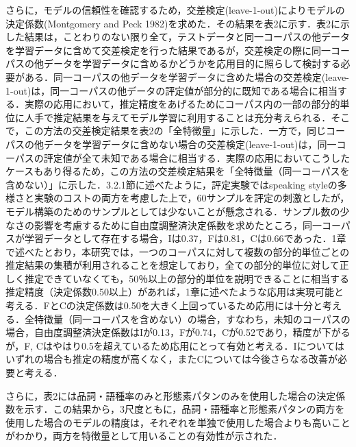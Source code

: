 \documentclass[japanese]{jnlp_1.4}
\begin{document}
さらに，モデルの信頼性を確認するため，交差検定(leave-1-out)によりモデルの決定係数(Montgomery and Peck 1982)を求めた．その結果を表2に示す．表2に示した結果は，ことわりのない限り全て，テストデータと同一コーパスの他データを学習データに含めて交差検定を行った結果であるが，交差検定の際に同一コーパスの他データを学習データに含めるかどうかを応用目的に照らして検討する必要がある．同一コーパスの他データを学習データに含めた場合の交差検定(leave-1-out)は，同一コーパスの他データの評定値が部分的に既知である場合に相当する．実際の応用において，推定精度をあげるためにコーパス内の一部の部分的単位に人手で推定結果を与えてモデル学習に利用することは充分考えられる．そこで，この方法の交差検定結果を表2の「全特徴量」に示した．一方で，同じコーパスの他データを学習データに含めない場合の交差検定(leave-1-out)は，同一コーパスの評定値が全て未知である場合に相当する．実際の応用においてこうしたケースもあり得るため，この方法の交差検定結果を「全特徴量（同一コーパスを含めない）」に示した．3.2.1節に述べたように，評定実験ではspeaking styleの多様さと実験のコストの両方を考慮した上で，60サンプルを評定の刺激としたが，モデル構築のためのサンプルとしては少ないことが懸念される．サンプル数の少なさの影響を考慮するために自由度調整済決定係数を求めたところ，同一コーパスが学習データとして存在する場合，Iは0.37，Fは0.81，Cは0.66であった．1章で述べたとおり，本研究では，一つのコーパスに対して複数の部分的単位ごとの推定結果の集積が利用されることを想定しており，全ての部分的単位に対して正しく推定できていなくても，50％以上の部分的単位を説明できることに相当する推定精度（決定係数0.50以上）があれば，1章に述べたような応用は実現可能と考える．FとCの決定係数は0.50を大きく上回っているため応用には十分と考える．全特徴量（同一コーパスを含めない）の場合，すなわち，未知のコーパスの場合，自由度調整済決定係数はIが0.13，Fが0.74，Cが0.52であり，精度が下がるが，F, Cはやはり0.5を超えているため応用にとって有効と考える．Iについてはいずれの場合も推定の精度が高くなく，またCについては今後さらなる改善が必要と考える．

さらに，表2には品詞・語種率のみと形態素パタンのみを使用した場合の決定係数を示す．この結果から，3尺度ともに，品詞・語種率と形態素パタンの両方を使用した場合のモデルの精度は，それぞれを単独で使用した場合よりも高いことがわかり，両方を特徴量として用いることの有効性が示された．

\begin{table}[p]
\begin{center}
\end{center}
\end{table}
\end{document}
